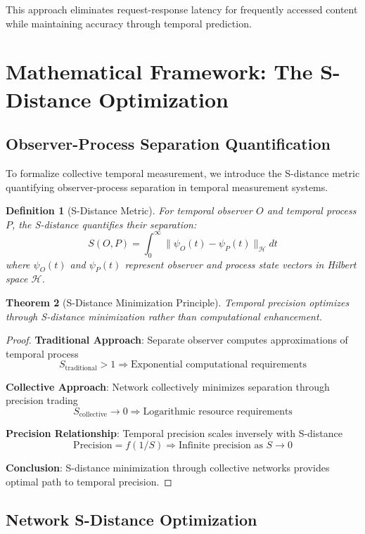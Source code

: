 \documentclass[12pt,a4paper]{article}
\newtheorem{theorem}{Theorem}[section]
\newtheorem{definition}[theorem]{Definition}
\begin{document}
This approach eliminates request-response latency for frequently accessed content while maintaining accuracy through temporal prediction.

\section{Mathematical Framework: The S-Distance Optimization}

\subsection{Observer-Process Separation Quantification}

To formalize collective temporal measurement, we introduce the S-distance metric quantifying observer-process separation in temporal measurement systems.

\begin{definition}[S-Distance Metric]
For temporal observer $O$ and temporal process $P$, the S-distance quantifies their separation:
$$S(O,P) = \int_0^{\infty} \|\psi_O(t) - \psi_P(t)\|_{\mathcal{H}} dt$$
where $\psi_O(t)$ and $\psi_P(t)$ represent observer and process state vectors in Hilbert space $\mathcal{H}$.
\end{definition}

\begin{theorem}[S-Distance Minimization Principle]
Temporal precision optimizes through S-distance minimization rather than computational enhancement.
\end{theorem}

\begin{proof}
\textbf{Traditional Approach}: Separate observer computes approximations of temporal process
$$S_{\text{traditional}} > 1 \Rightarrow \text{Exponential computational requirements}$$

\textbf{Collective Approach}: Network collectively minimizes separation through precision trading
$$S_{\text{collective}} \to 0 \Rightarrow \text{Logarithmic resource requirements}$$

\textbf{Precision Relationship}: Temporal precision scales inversely with S-distance
$$\text{Precision} = f(1/S) \Rightarrow \text{Infinite precision as } S \to 0$$

\textbf{Conclusion}: S-distance minimization through collective networks provides optimal path to temporal precision.
\end{proof}

\subsection{Network S-Distance Optimization}
\end{document}

